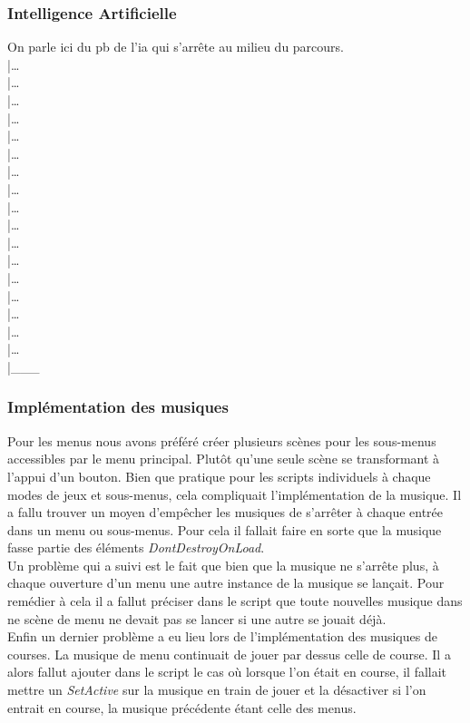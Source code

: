\documentclass[12pt,a4paper]{article}
\newcommand{\AI}{Intelligence Artificielle}
\begin{document}
            \subsubsection{\AI}
                On parle ici du pb de l'ia qui s'arrête au milieu du parcours.\\
                |\dots\\|\dots\\|\dots\\|\dots\\|\dots\\|\dots\\|\dots\\|\dots\\|\dots\\
                |\dots\\|\dots\\|\dots\\|\dots\\|\dots\\|\dots\\|\dots\\|\dots\\|\_\_\_\\

            \subsubsection{Implémentation des musiques}
                Pour les menus nous avons préféré créer plusieurs scènes pour les sous-menus accessibles
                par le menu principal. Plutôt qu'une seule scène se transformant à l'appui d'un bouton.
                Bien que pratique pour les scripts individuels à chaque modes de jeux et sous-menus,
                cela compliquait l'implémentation de la musique. Il a fallu trouver un moyen d'empêcher
                les musiques de s'arrêter à chaque entrée dans un menu ou sous-menus. Pour cela il
                fallait faire en sorte que la musique fasse partie des éléments
                \textsl{DontDestroyOnLoad}.\\
                Un problème qui a suivi est le fait que bien que la musique ne s'arrête plus, à chaque
                ouverture d'un menu une autre instance de la musique se lançait. Pour remédier à cela il
                a fallut préciser dans le script que toute nouvelles musique dans ne scène de menu ne
                devait pas se lancer si une autre se jouait déjà.\\
                Enfin un dernier problème a eu lieu lors de l'implémentation des musiques de courses. La
                musique de menu continuait de jouer par dessus celle de course. Il a alors fallut
                ajouter dans le script le cas où lorsque l'on était en course, il fallait mettre un
                \textsl{SetActive} sur la musique en train de jouer et la désactiver si l'on entrait en
                course, la musique précédente étant celle des menus.
\end{document}
